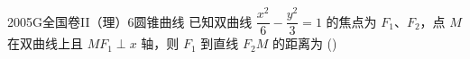 
\begin{problem}{2005}{G}{全国卷II（理）}{6}{圆锥曲线}
已知双曲线 $ \dfrac{x^2}{6}-\dfrac{y^2}{3}=1 $ 的焦点为 $ F_1 $、$ F_2 $，点 $ M $ 在双曲线上且 $ MF_1\perp x $ 轴，则 $ F_1 $ 到直线 $ F_2M $ 的距离为 (\hspace{1cm})
\begin{choices}
\end{choices}
\end{problem}

\begin{answer}

\end{answer}

\begin{solutions}

\end{solutions}